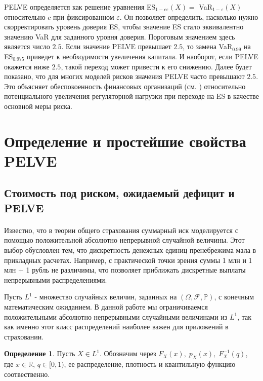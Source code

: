 \documentclass[12pt]{article}
\theoremstyle{plain}
\theoremstyle{definition}
\newtheorem{definition}{Определение}[section]
\theoremstyle{remark}
\begin{document}
PELVE определяется как решение уравнения ES$_{1-c\varepsilon}(X)=$ VaR$_{1-\varepsilon}(X)$ относительно $c$ при фиксированном $\varepsilon$. Он позволяет определить, насколько нужно скорректировать уровень доверия ES, чтобы значение ES стало эквивалентно значению VaR для заданного уровня доверия. Пороговым значением здесь является число $2.5$. Если значение PELVE превышает $2.5$, то замена VaR$_{0.99}$ на ES$_{0.975}$ приведет к необходимости увеличения капитала. И наоборот, если PELVE окажется ниже $2.5$, такой переход может привести к его снижению. Далее будет показано, что для многих моделей рисков значения PELVE часто превышают $2.5$. Это объясняет обеспокоенность финансовых организаций (см. \cite{BCBS2015}) относительно потенциального увеличения регуляторной нагрузки при переходе на ES в качестве основной меры риска.

 

\section{Определение и простейшие свойства PELVE}

\subsection{Стоимость под риском, ожидаемый дефицит и PELVE}
\paragraph{}
Известно, что в теории общего страхования суммарный иск моделируется с помощью положительной абсолютно непрерывной случайной величины. Этот выбор обусловлен тем, что дискретность денежных единиц пренебрежима мала в прикладных расчетах. Например, с практической точки зрения суммы 1 млн и 1 млн $+$ 1 рубль не различимы, что позволяет приближать дискретные выплаты непрерывными распределениями.

Пусть $L^1$ - множество случайных величин, заданных на $(\Omega, \mathcal{F}, \mathbb{P})$, с конечным математическим ожиданием. В данной работе мы ограничиваемся положительными абсолютно непрерывными случайными величинами из $L^1$, так как именно этот класс распределений наиболее важен для приложений в страховании.
\begin{definition}
    Пусть $X \in L^1$. Обозначим через $F_X(x),\;p_X(x),\; F_X^{-1}(q)$, где $x \in \mathbb{R}$, $ q \in [0,1)$, ее распределение, плотность и квантильную функцию соотвественно.
\end{definition}
\end{document}
